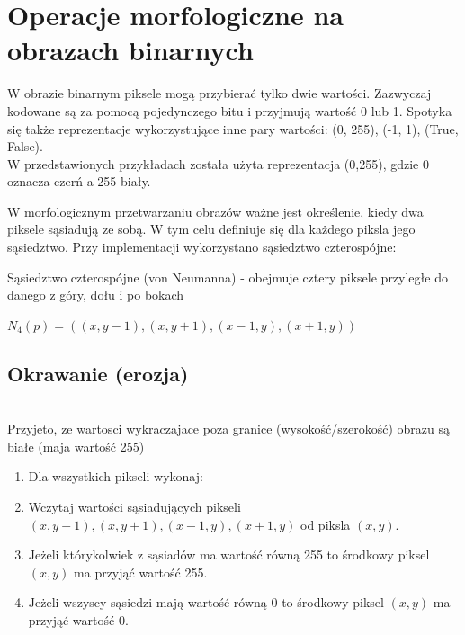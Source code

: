 \documentclass[final,a4paper,openany,12pt]{mwbk}
\begin{document}
\newpage

\chapter{Operacje morfologiczne na obrazach binarnych}

W obrazie binarnym piksele mogą przybierać tylko dwie wartości. Zazwyczaj kodowane są za pomocą pojedynczego bitu i przyjmują wartość 0 lub 1. Spotyka się także reprezentacje wykorzystujące inne pary wartości: (0, 255), (-1, 1), (True, False). \\
W przedstawionych przykładach została użyta reprezentacja (0,255), gdzie 0 oznacza czerń a 255 biały.

W morfologicznym przetwarzaniu obrazów ważne jest określenie, kiedy dwa piksele sąsiadują ze sobą. W tym celu definiuje się dla każdego piksla jego sąsiedztwo. Przy implementacji wykorzystano sąsiedztwo czterospójne: 

	Sąsiedztwo czterospójne (von Neumanna) - obejmuje cztery piksele przyległe do danego z góry, dołu i po bokach
	\begin{center}
	 $N_{4}(p)=((x,y-1),(x,y+1),(x-1,y),(x+1,y))$
	 \end{center}

\section{ Okrawanie (erozja)}
\hfill\\
\indent
       Przyjeto, ze wartosci wykraczajace poza granice (wysokość/szerokość) obrazu są białe (maja wartość 255)\\
	\begin{enumerate}	
		\item Dla wszystkich pikseli wykonaj:
		\item Wczytaj wartości sąsiadujących pikseli $(x,y-1),(x,y+1),(x-1,y),(x+1,y)$ od piksla $(x,y)$.
		\item Jeżeli którykolwiek z sąsiadów ma wartość równą 255 to środkowy piksel $(x,y)$ ma przyjąć wartość 255. 
		\item Jeżeli wszyscy sąsiedzi mają wartość równą 0 to środkowy piksel $(x,y)$ ma przyjąć wartość 0.
	\end{enumerate}
\end{document}
